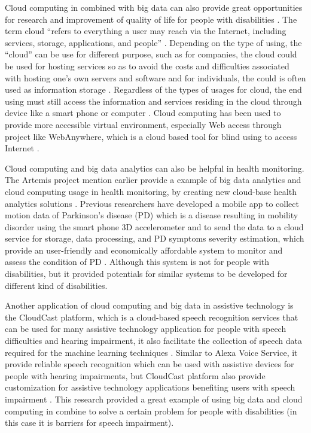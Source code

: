\documentclass[sigconf]{acmart}
\begin{document}
Cloud computing in combined with big data can also provide great opportunities for research and improvement of
quality of life for people with disabilities \cite{Caldwell2011}. The term cloud ``refers to everything a user may reach via the 
Internet, including services, storage, applications, and people'' \cite{Hoehl2010}. Depending on the type of 
using, the ``cloud'' can be use for different purpose, such as for companies, the cloud could be used for hosting
services so as to avoid the costs and difficulties associated with hosting one’s own servers and software and for
individuals, the could is often used as information storage \cite{Khazaei14}. Regardless of the types of usages 
for cloud, the end using must still access the information and services residing in the cloud through device like
a smart phone or computer \cite{Hoehl2010}. Cloud computing has been used to provide more accessible virtual 
environment, especially Web access through project like WebAnywhere, which is a cloud based tool for blind using 
to access Internet \cite{Hoehl2010}. 

Cloud computing and big data analytics can also be helpful in health monitoring. The Artemis project mention earlier
provide a example of big data analytics and cloud computing usage in health monitoring, by creating new cloud-base
health analytics solutions \cite{Khazaei14}. Previous researchers have developed a mobile app to collect motion 
data of Parkinson's disease (PD) which is a disease resulting in mobility disorder using the smart phone 3D 
accelerometer and to send the data to a cloud service for storage, data processing, and PD symptoms severity
estimation, which provide an user-friendly and economically affordable system to monitor and assess the condition
of PD \cite{info:doi/10.2196/mhealth.3956}. Although this system is not for people with disabilities, but it 
provided potentials for similar systems to be developed for different kind of disabilities. 

Another application of cloud computing and big data in assistive technology is the CloudCast platform, which is a 
cloud-based speech recognition services that can be used for many assistive technology application for people
with speech difficulties and hearing impairment, it also facilitate the collection of speech data required for
the machine learning techniques \cite{cunningham2017cloud}. Similar to Alexa Voice Service, it provide reliable 
speech recognition which can be used with assistive devices for people with hearing impairments, but CloudCast
platform also provide customization for assistive technology applications benefiting users with speech 
impairment \cite{cunningham2017cloud}. This research provided a great example of using big data and cloud 
computing in combine to solve a certain problem for people with disabilities (in this case it is barriers for speech impairment). 
\end{document}
